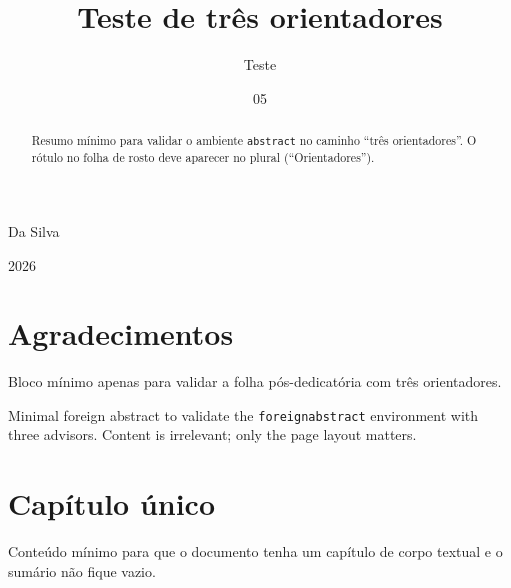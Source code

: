 \documentclass[dsc]{ufrj}
\begin{document}
  \title{Teste de três orientadores}
  \author{Teste}{Da Silva}


  \date{05}{2026}


  \maketitle

  \frontmatter
  \dedication{Dedico a quem revisar este teste.}

  \chapter*{Agradecimentos}
  Bloco mínimo apenas para validar a folha pós-dedicatória com três
  orientadores.

  \begin{abstract}
  Resumo mínimo para validar o ambiente \texttt{abstract} no caminho
  ``três orientadores''. O rótulo no folha de rosto deve aparecer no
  plural (``Orientadores'').
  \end{abstract}

  \begin{foreignabstract}
  Minimal foreign abstract to validate the \texttt{foreignabstract}
  environment with three advisors. Content is irrelevant; only the page
  layout matters.
  \end{foreignabstract}

  \tableofcontents

  \mainmatter
  \chapter{Capítulo único}
  Conteúdo mínimo para que o documento tenha um capítulo de corpo
  textual e o sumário não fique vazio.

  \ufrjfinalpage%
\end{document}
